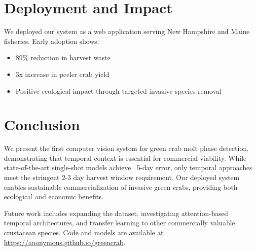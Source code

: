 \documentclass[10pt,twocolumn,letterpaper]{article}
\begin{document}
\section{Deployment and Impact}

We deployed our system as a web application serving New Hampshire and Maine fisheries. Early adoption shows:
\begin{itemize}
\item 89\% reduction in harvest waste
\item 3x increase in peeler crab yield
\item Positive ecological impact through targeted invasive species removal
\end{itemize}

\section{Conclusion}

We present the first computer vision system for green crab molt phase detection, demonstrating that temporal context is essential for commercial viability. While state-of-the-art single-shot models achieve ~5-day error, only temporal approaches meet the stringent 2-3 day harvest window requirement. Our deployed system enables sustainable commercialization of invasive green crabs, providing both ecological and economic benefits.

Future work includes expanding the dataset, investigating attention-based temporal architectures, and transfer learning to other commercially valuable crustacean species. Code and models are available at \url{https://anonymous.github.io/greencrab}.
\end{document}

